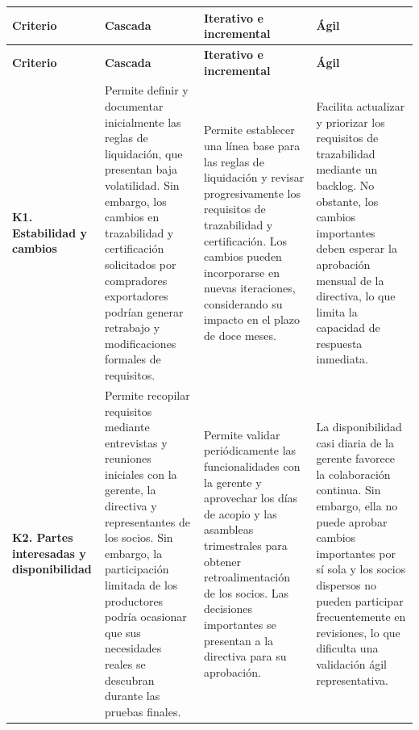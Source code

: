 \documentclass[12pt,a4paper]{article}
\begin{document}
\begin{longtable}{|>{\raggedright\arraybackslash}p{}|>{\raggedright\arraybackslash}p{}|>{\raggedright\arraybackslash}p{}|>{\raggedright\arraybackslash}p{}|}

\hline
\textbf{Criterio} &
\textbf{Cascada} &
\textbf{Iterativo e incremental} &
\textbf{Ágil} \\
\hline
\endfirsthead

\hline
\textbf{Criterio} &
\textbf{Cascada} &
\textbf{Iterativo e incremental} &
\textbf{Ágil} \\
\hline
\endhead

\textbf{K1. Estabilidad y cambios} &
Permite definir y documentar inicialmente las reglas de liquidación, que presentan baja volatilidad. Sin embargo, los cambios en trazabilidad y certificación solicitados por compradores exportadores podrían generar retrabajo y modificaciones formales de requisitos. &
Permite establecer una línea base para las reglas de liquidación y revisar progresivamente los requisitos de trazabilidad y certificación. Los cambios pueden incorporarse en nuevas iteraciones, considerando su impacto en el plazo de doce meses. &
Facilita actualizar y priorizar los requisitos de trazabilidad mediante un backlog. No obstante, los cambios importantes deben esperar la aprobación mensual de la directiva, lo que limita la capacidad de respuesta inmediata. \\
\hline

\textbf{K2. Partes interesadas y disponibilidad} &
Permite recopilar requisitos mediante entrevistas y reuniones iniciales con la gerente, la directiva y representantes de los socios. Sin embargo, la participación limitada de los productores podría ocasionar que sus necesidades reales se descubran durante las pruebas finales. &
Permite validar periódicamente las funcionalidades con la gerente y aprovechar los días de acopio y las asambleas trimestrales para obtener retroalimentación de los socios. Las decisiones importantes se presentan a la directiva para su aprobación. &
La disponibilidad casi diaria de la gerente favorece la colaboración continua. Sin embargo, ella no puede aprobar cambios importantes por sí sola y los socios dispersos no pueden participar frecuentemente en revisiones, lo que dificulta una validación ágil representativa. \\
\hline


\end{longtable}
\end{document}
